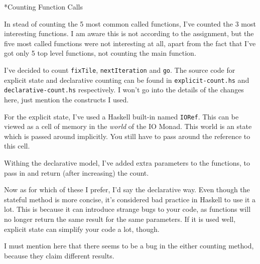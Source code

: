 \documentclass[a4paper,12pt]{article}
\begin{document}
\begin{section}
\begin{subsection}
\begin{subsubsection}
        \end{subsubsection}

    \end{subsection}



    \begin{subsection}*{Counting Function Calls}

        In stead of counting the 5 most common called functions, I've counted
        the 3 most interesting functions. I am aware this is not according to
        the assignment, but the five most called functions were not interesting
        at all, apart from the fact that I've got only 5 top level functions, not
        counting the main function.

        I've decided to count \texttt{fixTile}, \texttt{nextIteration} and
        \texttt{go}. The source code for explicit state and declarative counting
        can be found in \texttt{explicit-count.hs} and
        \texttt{declarative-count.hs} respectively. I won't go into the details
        of the changes here, just mention the constructs I used.

        For the explicit state, I've used a Haskell built-in named
        \texttt{IORef}. This can be viewed as a cell of memory in the
        \textit{world} of the IO Monad. This world is an state which is passed
        around implicitly. You still have to pass around the reference to this
        cell.

        Withing the declarative model, I've added extra parameters to the
        functions, to pass in and return (after increasing) the count.

        Now as for which of these I prefer, I'd say the declarative way. Even
        though the stateful method is more concise, it's considered bad practice
        in Haskell to use it a lot. This is because it can introduce strange
        bugs to your code, as functions will no longer return the same result
        for the same parameters. If it is used well, explicit state can simplify
        your code a lot, though.

        I must mention here that there seems to be a bug in the either counting
        method, because they claim different results.

    \end{subsection}


\end{section}
\end{document}
